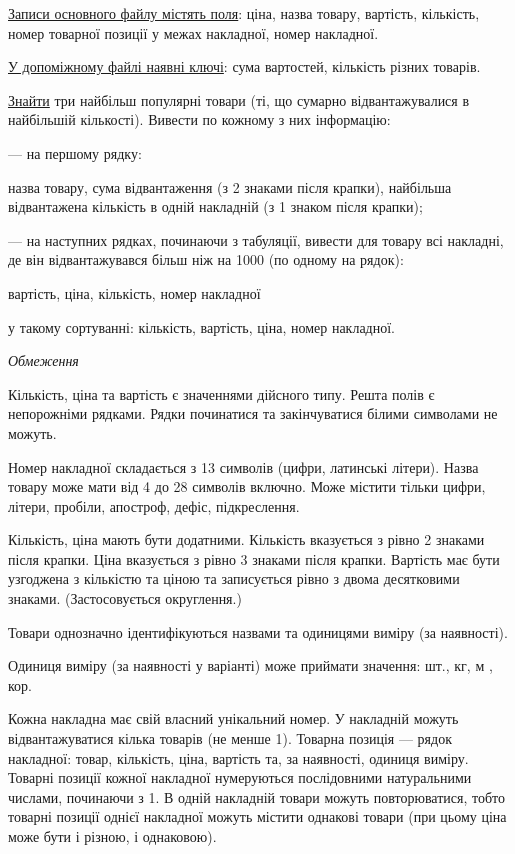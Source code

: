 \documentclass[11pt, ukrainian]{article}
\begin{document}
\underline{Записи основного файлу містять поля}: ціна, назва товару, вартість, кількість, номер товарної позиції у межах накладної, номер накладної.

\underline{У допоміжному файлі наявні ключі}: сума вартостей, кількість різних товарів.

\underline{Знайти} три найбільш популярні товари (ті, що сумарно відвантажувалися в найбільшій кількості). Вивести по кожному з них інформацію:\par
{\noindent}--- на першому рядку:\par
назва товару, сума відвантаження (з 2 знаками після крапки), найбільша відвантажена кількість в одній накладній (з 1 знаком після крапки);

{\noindent}--- на наступних рядках, починаючи з табуляції, вивести для товару всі накладні, де він відвантажувався більш ніж на 1000 (по одному на рядок):\par
вартість, ціна, кількість, номер накладної

{\noindent}у такому сортуванні: кількість, вартість, ціна, номер накладної.


\bigskip\textit{Обмеження}

Кількість, ціна та вартість є значеннями дійсного типу.
Решта полів є непорожніми рядками.
Рядки починатися та закінчуватися білими символами не можуть.

Номер накладної складається з 13 символів (цифри, латинські літери).
Назва товару може мати від 4 до 28 символів включно.
Може містити тільки цифри, літери, пробіли, апостроф, дефіс, підкреслення.

Кількість, ціна мають бути додатними.
Кількість вказується з рівно 2 знаками після крапки.
Ціна вказується з рівно 3 знаками після крапки.
Вартість має бути узгоджена з кількістю та ціною та записується рівно з двома десятковими знаками.
(Застосовується округлення.)

Товари однозначно ідентифікуються назвами та одиницями виміру (за наявності).

Одиниця виміру (за наявності у варіанті) може приймати значення: шт., кг, м , кор.

Кожна накладна має свій власний унікальний номер.
У накладній можуть відвантажуватися кілька товарів (не менше 1).
Товарна позиція --- рядок накладної: товар, кількість, ціна, вартість та, за наявності, одиниця виміру.
Товарні позиції кожної накладної нумеруються послідовними натуральними числами, починаючи з 1.
В одній накладній товари можуть повторюватися, 
тобто товарні позиції однієї накладної можуть містити однакові товари 
(при цьому ціна може бути і різною, і однаковою).
\end{document}
